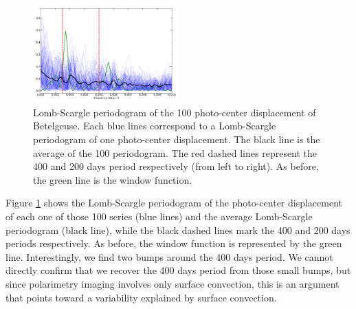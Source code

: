 \documentclass{aa}
\begin{document}
\begin{figure}[!h]
    \centering
    \includegraphics[width=0.5\textwidth]{Lomb-Scargle Photo-center.pdf}
    \caption{Lomb-Scargle periodogram of the 100 photo-center displacement of Betelgeuse. Each blue lines correspond to a Lomb-Scargle periodogram of one photo-center
     displacement. The black line is the average of the 100 periodogram. The red dashed lines represent the 400 and 200 days period respectively 
     (from left to right). As before, the green line is the window function.}
    \label{LS photocenter}
\end{figure}

Figure \ref{LS photocenter} shows the Lomb-Scargle periodogram of the photo-center displacement of each one of those 100 series (blue lines) and the average Lomb-Scargle periodogram (black line), 
while the black dashed lines mark the 400 and 
200 days periods respectively. As before, the window function is represented by the green line. Interestingly, we find two bumps around the 400 days period. We cannot directly confirm that we recover the 400 days period from those small bumps, but since polarimetry imaging involves only surface convection, this is an argument that points toward a variability explained by surface convection. 
\end{document}
